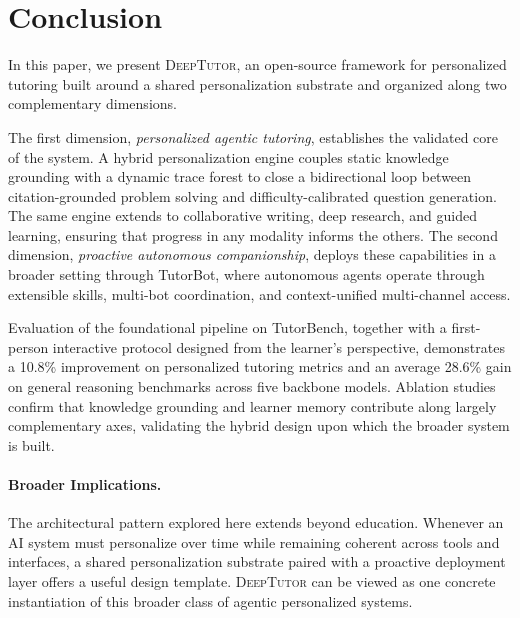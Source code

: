 \section{Conclusion}
\label{sec:conclusion}

In this paper, we present \textsc{DeepTutor}, an open-source framework for personalized tutoring built around a shared personalization substrate and organized along two complementary dimensions.

The first dimension, \emph{personalized agentic tutoring}, establishes the validated core of the system.
A hybrid personalization engine couples static knowledge grounding with a dynamic trace forest to close a bidirectional loop between citation-grounded problem solving and difficulty-calibrated question generation.
The same engine extends to collaborative writing, deep research, and guided learning, ensuring that progress in any modality informs the others.
The second dimension, \emph{proactive autonomous companionship}, deploys these capabilities in a broader setting through TutorBot, where autonomous agents operate through extensible skills, multi-bot coordination, and context-unified multi-channel access.

Evaluation of the foundational pipeline on TutorBench, together with a first-person interactive protocol designed from the learner's perspective, demonstrates a 10.8\% improvement on personalized tutoring metrics and an average 28.6\% gain on general reasoning benchmarks across five backbone models.
Ablation studies confirm that knowledge grounding and learner memory contribute along largely complementary axes, validating the hybrid design upon which the broader system is built.

\paragraph{Broader Implications.}
The architectural pattern explored here extends beyond education.
Whenever an AI system must personalize over time while remaining coherent across tools and interfaces, a shared personalization substrate paired with a proactive deployment layer offers a useful design template.
\textsc{DeepTutor} can be viewed as one concrete instantiation of this broader class of agentic personalized systems.

